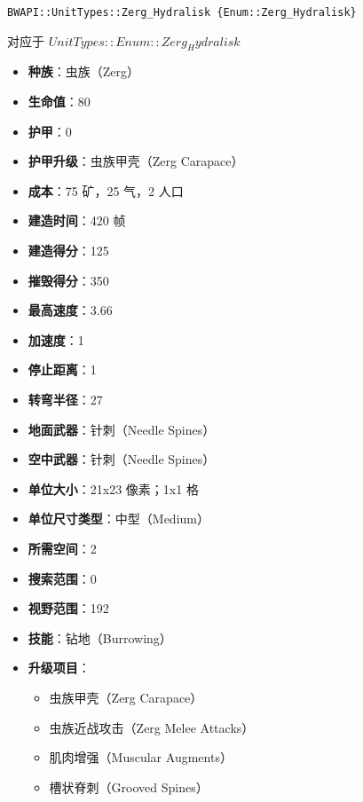 \begin{tcolorbox}[colback=white, colframe=black!60!white, title=Zerg\_Hydralisk(), arc=0mm]
    \begin{verbatim}
BWAPI::UnitTypes::Zerg_Hydralisk {Enum::Zerg_Hydralisk}
    \end{verbatim}
    对应于  $ UnitTypes::Enum::Zerg_Hydralisk $ 
    \begin{itemize}
        \item \textbf{种族}：虫族（Zerg）
        \item \textbf{生命值}：80
        \item \textbf{护甲}：0
        \item \textbf{护甲升级}：虫族甲壳（Zerg Carapace）
        \item \textbf{成本}：75 矿，25 气，2 人口
        \item \textbf{建造时间}：420 帧
        \item \textbf{建造得分}：125
        \item \textbf{摧毁得分}：350
        \item \textbf{最高速度}：3.66
        \item \textbf{加速度}：1
        \item \textbf{停止距离}：1
        \item \textbf{转弯半径}：27
        \item \textbf{地面武器}：针刺（Needle Spines）
        \item \textbf{空中武器}：针刺（Needle Spines）
        \item \textbf{单位大小}：21x23 像素；1x1 格
        \item \textbf{单位尺寸类型}：中型（Medium）
        \item \textbf{所需空间}：2
        \item \textbf{搜索范围}：0
        \item \textbf{视野范围}：192
        \item \textbf{技能}：钻地（Burrowing）
        \item \textbf{升级项目}：
            \begin{itemize}
                \item 虫族甲壳（Zerg Carapace）
                \item 虫族近战攻击（Zerg Melee Attacks）
                \item 肌肉增强（Muscular Augments）
                \item 槽状脊刺（Grooved Spines）
            \end{itemize}

\end{itemize}
\end{tcolorbox}
